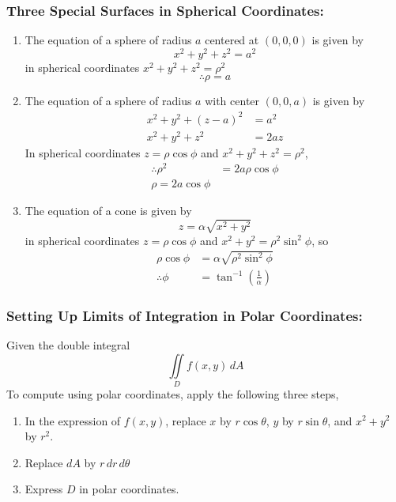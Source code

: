 \documentclass[14pt]{article}
\begin{document}
    \subsubsection{Three Special Surfaces in Spherical Coordinates:}
    \begin{enumerate}
        \item The equation of a sphere of radius $a$ centered at
        $(0,0,0)$ is given by 
        $$x^2+y^2+z^2=a^2$$ in spherical coordinates
        $x^2+y^2+z^2=\rho^2$
        $$\therefore \rho=a$$
        \item The equation of a sphere of radius $a$ with center
        $(0,0,a)$ is given by 
        \begin{align*}
            x^2+y^2+(z-a)^2&=a^2\\
            x^2+y^2+z^2&=2az
        \end{align*}
        In spherical coordinates $z=\rho\cos\phi$ and
        $x^2+y^2+z^2=\rho^2$, 
        \begin{align*}
            \therefore\rho^2&=2a\rho\cos\phi\\
            \rho=2a\cos\phi
        \end{align*}
        \item The equation of a cone is given by
        $$z=\alpha \sqrt{x^2+y^2}$$ in spherical coordinates
        $z=\rho\cos\phi$ and $x^2+y^2=\rho^2\sin^2\phi$, so
        \begin{align*}
            \rho\cos\phi&=\alpha\sqrt{\rho^2\sin^2\phi}\\
            \therefore \phi&=\tan^{-1}\left(\frac{1}{\alpha}\right)
        \end{align*}
    \end{enumerate}
    \subsubsection{Setting Up Limits of Integration in Polar Coordinates:}
    Given the double integral
    $$\iint\limits_Df(x,y)\,dA$$ To compute using polar coordinates,
    apply the following three steps,
    \begin{enumerate}
        \item In the expression of $f(x,y)$, replace $x$ by
        $r\cos\theta$, $y$ by $r\sin\theta$, and $x^2+y^2$ by $r^2$.
        \item Replace $dA$ by $r\, dr\, d\theta$
        \item Express $D$ in polar coordinates.
    \end{enumerate}
\end{document}
